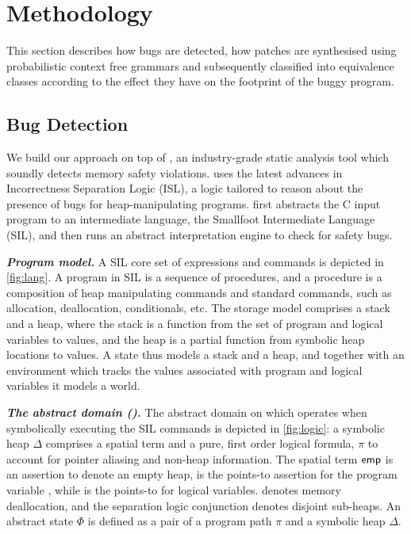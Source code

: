 \section{Methodology}

This section describes how bugs are detected, how patches are synthesised using probabilistic context free grammars
and subsequently classified into equivalence classes according to the effect they have on the footprint of the buggy program.

\subsection{Bug Detection}
We build our approach on top of \pulse \cite{pulse-link}, an industry-grade static analysis tool 
which soundly detects memory safety violations. \pulse uses the latest advances in Incorrectness Separation Logic (ISL), a logic tailored to reason about the presence of bugs for heap-manipulating programs. \pulse first abstracts the C input program to an intermediate language, the Smallfoot Intermediate Language (SIL),
and then runs an abstract interpretation engine to check for safety bugs.

\noindent \emph{\bf Program model.} A SIL core set of expressions and commands is depicted in \autoref{fig:lang}. A program in SIL is a sequence of procedures, and a procedure is a composition of heap manipulating commands and standard commands, such as allocation, deallocation, conditionals, etc. The storage model comprises a stack and a heap, where the stack is a function from the set of program and logical variables to values, and the heap is a partial function from symbolic heap locations to values. 
A state thus models a stack and a heap, and together with an environment which tracks the values associated with program and logical variables it models a \pulse world.

\noindent \emph{\bf The abstract domain (\domaindetect).} The abstract domain on which \pulse operates when symbolically executing the SIL commands is depicted in \autoref{fig:logic}: a symbolic heap $\Delta$ comprises a spatial term  and a pure, first order logical formula, $\pi$ to account for pointer aliasing and non-heap information. 
%
The spatial term 
$\mathsf{emp}$ is an assertion to denote an empty heap,    is the points-to assertion for the program variable , while 
  is the points-to for logical variables.   denotes memory deallocation, and  the separation logic conjunction   denotes disjoint sub-heaps. 
 An abstract state $\Phi$ is defined as a pair of a program path $\pi$ and a symbolic heap $\Delta$.
 
